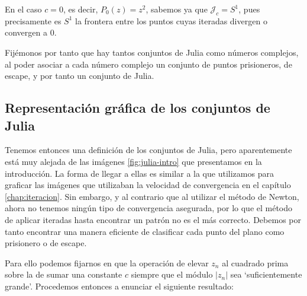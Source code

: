 \begin{ejemplo}
  En el caso $c=0$, es decir, $P_0(z)=z^2$, sabemos ya que $\mathcal{J}_c=S^1$, pues precisamente es $S^1$ la frontera entre los puntos cuyas iteradas divergen o convergen a $0$.
\end{ejemplo}

\begin{observacion}
  Fijémonos por tanto que hay tantos conjuntos de Julia como números complejos, al poder asociar a cada número complejo un conjunto de puntos prisioneros, de escape, y por tanto un conjunto de Julia.
\end{observacion}

\subsection{Representación gráfica de los conjuntos de Julia}
\label{subsection:representacion-julia}

Tenemos entonces una definición de los conjuntos de Julia, pero aparentemente está muy alejada de las imágenes \ref{fig:julia-intro} que presentamos en la introducción. La forma de llegar a ellas es similar a la que utilizamos para graficar las imágenes que utilizaban la velocidad de convergencia en el capítulo \ref{chap:iteracion}. Sin embargo, y al contrario que al utilizar el método de Newton, ahora no tenemos ningún tipo de convergencia asegurada, por lo que el método de aplicar iteradas hasta encontrar un patrón no es el más correcto. Debemos por tanto encontrar una manera eficiente de clasificar cada punto del plano como prisionero o de escape. 

Para ello podemos fijarnos en que la operación de elevar $z_n$ al cuadrado prima sobre la de sumar una constante $c$ siempre que el módulo $|z_n|$ sea `suficientemente grande'. Procedemos entonces a enunciar el siguiente resultado:

